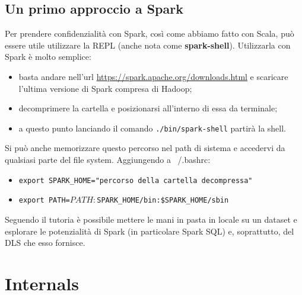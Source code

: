 \documentclass[12pt,italian]{article}
\begin{document}
\subsection{Un primo approccio a Spark}
Per prendere confidenzialità con Spark, così come abbiamo fatto con Scala, può essere utile utilizzare la REPL (anche nota come \textbf{spark-shell}). 
Utilizzarla con Spark è molto semplice:
\begin{itemize}
	\item basta andare nell'url \url{https://spark.apache.org/downloads.html} e scaricare l'ultima versione di Spark compresa di Hadoop;
	\item decomprimere la cartella e posizionarsi all'interno di essa da terminale;
	\item a questo punto lanciando il comando \texttt{./bin/spark-shell} partirà la shell.
\end{itemize}
Si può anche memorizzare questo percorso nel path di sistema e accedervi da qualsiasi parte del file system. Aggiungendo a ~/.bashrc:
\begin{itemize}
	\item \texttt{export SPARK\_HOME="percorso della cartella decompressa"} 
	\item \texttt{export PATH=$PATH:$SPARK\_HOME/bin:\$SPARK\_HOME/sbin}
\end{itemize}

Seguendo il tutoria \cite{localexample} è possibile mettere le mani in pasta in locale su un dataset e esplorare le potenzialità di Spark (in particolare Spark SQL) e, soprattutto, del DLS che esso fornisce.
\section{Internals}
\end{document}
